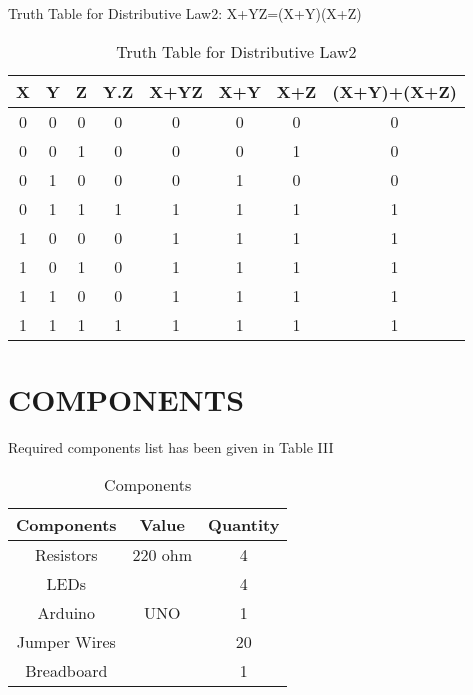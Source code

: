 \documentclass[conference]{IEEEtran}
\begin{document}
Truth Table for Distributive Law2: X+YZ=(X+Y)(X+Z)
\begin{table}[htbp]
    \centering
\begin{tabular}{ | c | c | c | c | c | c | c | c | } \hline
X & Y & Z & Y.Z & X+YZ & X+Y & X+Z & (X+Y)+(X+Z) \\\hline
0 & 0 & 0 & 0 & 0 & 0 & 0 & 0 \\
0 & 0 & 1 & 0 & 0 & 0 & 1 & 0 \\
0 & 1 & 0 & 0 & 0 & 1 & 0 & 0 \\
0 & 1 & 1 & 1 & 1 & 1 & 1 & 1 \\
1 & 0 & 0 & 0 & 1 & 1 & 1 & 1 \\
1 & 0 & 1 & 0 & 1 & 1 & 1 & 1 \\
1 & 1 & 0 & 0 & 1 & 1 & 1 & 1 \\
1 & 1 & 1 & 1 & 1 & 1 & 1 & 1 \\ \hline
\end{tabular}
\caption{\label{tab:widgets}Truth Table for Distributive Law2}
\end{table}

\section{COMPONENTS}
Required components list has been given in Table III
\begin{table}[h]
\centering
\begin{tabular}{| c | c | c |} \hline
Components & Value & Quantity \\\hline
Resistors & 220 ohm & 4 \\
LEDs &  & 4 \\
Arduino & UNO & 1 \\
Jumper Wires &  & 20 \\
Breadboard & & 1 \\ 
\hline
\end{tabular}
\caption{\label{tab:widgets}Components}
\end{table}
\end{document}
